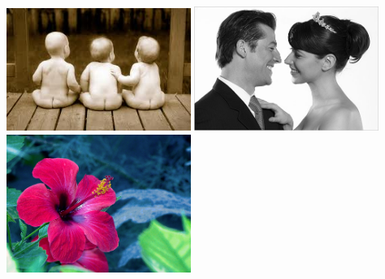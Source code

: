 \documentclass[utf8]{beamer}
\begin{document}
	\begin{frame}
		\begin{center} 
				 \includegraphics[width=0.45\textwidth]{images.jpg} %
				 \includegraphics[width=0.45\textwidth]{4.jpg} %
				 \newline				 
\includegraphics[width=0.45\textwidth]{5.jpg} %
		\end{center}
	\end{frame}
\end{document}
